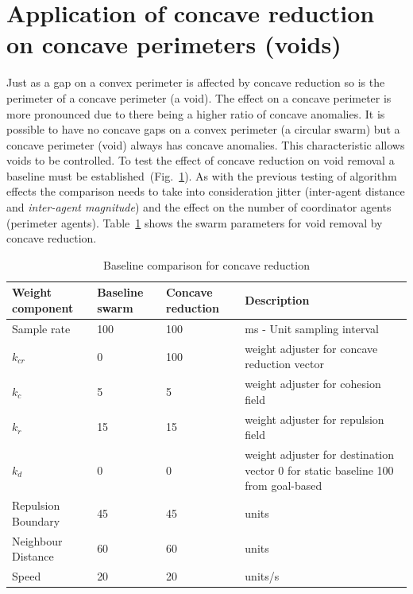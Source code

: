 \documentclass{ieeeaccess}
\begin{document}
\section{Application of concave reduction on concave perimeters (voids)}\label{sec:ApplicationConcavePerimeters}
Just as a gap on a convex perimeter is affected by concave reduction so is the perimeter of a concave perimeter (a void). The effect on a concave perimeter is more pronounced due to there being a higher ratio of concave anomalies. It is possible to have no concave gaps on a convex perimeter (a circular swarm) but a concave perimeter (void) always has concave anomalies. This characteristic allows voids to be controlled. To test the effect of concave reduction on void removal a baseline must be established~(Fig.~\ref{tab:BaselineConcaveReduction3}).
As with the previous testing of algorithm effects the comparison needs to take into consideration jitter (inter-agent distance and \textit{inter-agent magnitude}) and the effect on the number of coordinator agents (perimeter agents). 
Table~\ref{tab:BaselineConcaveReduction3} shows the swarm parameters for void removal by concave reduction.

\begin{table}
\caption{Baseline comparison for concave reduction} 
\label{tab:BaselineConcaveReduction3}
\begin{center}
\begin{tabular}{| p{1.4cm} | p{1.2cm} | p{1.2cm} | p{2.5cm} |}
\hline
\bf Weight \bf component & \bf Baseline \bf swarm & \bf Concave \bf reduction & \bf Description \\ \hline
Sample rate & 100 & 100 & ms - Unit sampling interval\\  \hline
$k_{cr}$ & 0 & 100 & weight adjuster for concave reduction vector\\  \hline
$k_c$ & 5 & 5 & weight adjuster for cohesion field\\  \hline
$k_r$ & 15 & 15 & weight adjuster for repulsion field\\  \hline
$k_d$ & 0 & 0 & weight adjuster for destination vector 0 for static baseline 100 from goal-based\\  \hline
Repulsion Boundary & 45 & 45 & units\\  \hline
Neighbour Distance & 60 & 60 & units\\  \hline
Speed & 20 & 20 & units/s\\  \hline
\end{tabular}
\end{center}
\end{table}
\end{document}
